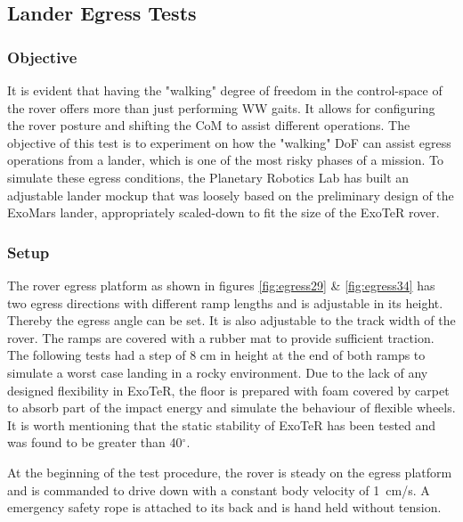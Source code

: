\documentclass[a4paper,twocolumn]{esapub2005} %
\begin{document}

\subsection{Lander Egress Tests} 

\subsubsection{Objective}
It is evident that having the "walking" degree of freedom in the control-space of the rover offers more than just performing WW gaits. It allows for configuring the rover posture and shifting the CoM to assist different operations. The objective of this test is to experiment on how the "walking" DoF can assist egress operations from a lander, which is one of the most risky phases of a mission. To simulate these egress conditions, the Planetary Robotics Lab has built an adjustable lander mockup that was loosely based on the preliminary design of the ExoMars lander, appropriately scaled-down to fit the size of the ExoTeR rover. 

\subsubsection{Setup}
The rover egress platform as shown in figures \ref{fig:egress29} \& \ref{fig:egress34} has two egress directions with different ramp lengths and is adjustable in its height. Thereby the egress
angle can be set. It is also adjustable to the track width of the rover. The
ramps are covered with a rubber mat to provide sufficient traction. The
following tests had a step of 8 cm in height at the end of both ramps to simulate
a worst case landing in a rocky environment.  Due to the lack of any designed
flexibility in ExoTeR, the floor is prepared with foam covered by carpet to
absorb part of the impact energy and simulate the behaviour of flexible wheels. It is worth mentioning that the static stability of ExoTeR has been tested and was found to be greater than 40$^\circ$.

At the beginning of the test procedure, the rover is steady on the egress platform and is commanded to drive down with a constant body velocity of 1~\unit{cm/s}. A emergency safety rope is attached to its back and is hand held without tension. 
\end{document}
